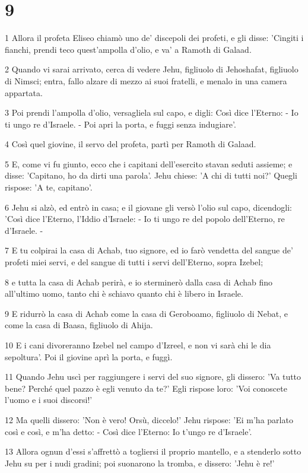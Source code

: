 \chapter{9}

\par 1 Allora il profeta Eliseo chiamò uno de' discepoli dei profeti, e gli disse: 'Cingiti i fianchi, prendi teco quest'ampolla d'olio, e va' a Ramoth di Galaad.
\par 2 Quando vi sarai arrivato, cerca di vedere Jehu, figliuolo di Jehoshafat, figliuolo di Nimsci; entra, fallo alzare di mezzo ai suoi fratelli, e menalo in una camera appartata.
\par 3 Poi prendi l'ampolla d'olio, versagliela sul capo, e digli: Così dice l'Eterno: - Io ti ungo re d'Israele. - Poi apri la porta, e fuggi senza indugiare'.
\par 4 Così quel giovine, il servo del profeta, partì per Ramoth di Galaad.
\par 5 E, come vi fu giunto, ecco che i capitani dell'esercito stavan seduti assieme; e disse: 'Capitano, ho da dirti una parola'. Jehu chiese: 'A chi di tutti noi?' Quegli rispose: 'A te, capitano'.
\par 6 Jehu si alzò, ed entrò in casa; e il giovane gli versò l'olio sul capo, dicendogli: 'Così dice l'Eterno, l'Iddio d'Israele: - Io ti ungo re del popolo dell'Eterno, re d'Israele. -
\par 7 E tu colpirai la casa di Achab, tuo signore, ed io farò vendetta del sangue de' profeti miei servi, e del sangue di tutti i servi dell'Eterno, sopra Izebel;
\par 8 e tutta la casa di Achab perirà, e io sterminerò dalla casa di Achab fino all'ultimo uomo, tanto chi è schiavo quanto chi è libero in Israele.
\par 9 E ridurrò la casa di Achab come la casa di Geroboamo, figliuolo di Nebat, e come la casa di Baasa, figliuolo di Ahija.
\par 10 E i cani divoreranno Izebel nel campo d'Izreel, e non vi sarà chi le dia sepoltura'. Poi il giovine aprì la porta, e fuggì.
\par 11 Quando Jehu uscì per raggiungere i servi del suo signore, gli dissero: 'Va tutto bene? Perché quel pazzo è egli venuto da te?' Egli rispose loro: 'Voi conoscete l'uomo e i suoi discorsi!'
\par 12 Ma quelli dissero: 'Non è vero! Orsù, diccelo!' Jehu rispose: 'Ei m'ha parlato così e così, e m'ha detto: - Così dice l'Eterno: Io t'ungo re d'Israele'.
\par 13 Allora ognun d'essi s'affrettò a togliersi il proprio mantello, e a stenderlo sotto Jehu su per i nudi gradini; poi suonarono la tromba, e dissero: 'Jehu è re!'
